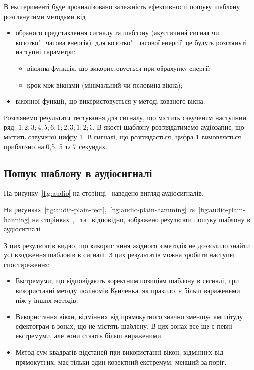     В експерименті буде проаналізовано залежність ефективності пошуку шаблону розглянутими методами від
    \begin{itemize}
        \item обраного представлення сигналу та шаблону (акустичний сигнал чи коротко"=часова енергія);
            для коротко"=часової енергії ще будуть розглянуті наступні параметри:
            \begin{itemize}
                \item віконна функція, що використовується при обрахунку енергії;
                \item крок між вікнами (мінімальний чи половина вікна);
            \end{itemize}
        \item віконної функції, що використовується у методі ковзного вікна.
    \end{itemize}

    Розглянемо результати тестування для сигналу, що містить озвученим наступний ряд: $1;2;3;4;5;6;1;2;3;1;2;3$.
    В якості шаблону розглядатимемо аудіозапис, що містить озвученої цифру 1.
    В сигналі, що розглядається, цифра 1 вимовляється приблизно на 0,5, 5 та 7 секундах.

    \subsection{Пошук шаблону в аудіосигналі}
        На рисунку~\ref{fig:audio} на сторінці~\pageref{fig:audio} наведено вигляд аудіосигналів.

        На рисунках~\ref{fig:audio-plain-rect},~\ref{fig:audio-plain-hamming} та~\ref{fig:audio-plain-hanning} на
        сторінках~\pageref{fig:audio-plain-rect},~\pageref{fig:audio-plain-hamming}
        та~\pageref{fig:audio-plain-hanning} відповідно, зображено результати пошуку шаблону в аудіосигналі.

        З цих результатів видно, що використання жодного з методів не дозволило знайти усі входження шаблонів в
        сигналі.
        З цих результатів можна зробити наступні спостереження:
        \begin{itemize}
            \item Екстремуми, що відповідають коректним позиціям шаблону в сигналі, при використанні методу поліномів
                Кунченка, як правило, є більш вираженими ніж у інших методів.
            \item Використання вікон, відмінних від прямокутного значно зменшує амплітуду ефектограм в зонах, що не
                містять шаблону.
                В цих зонах все ще є певні екстремуми, але вони стають більш вираженими.
            \item Метод сум квадратів відстаней при використанні вікон, відмінних від прямокутних, має тільки один
                коректний екстремум, менший за поріг.
        \end{itemize}

